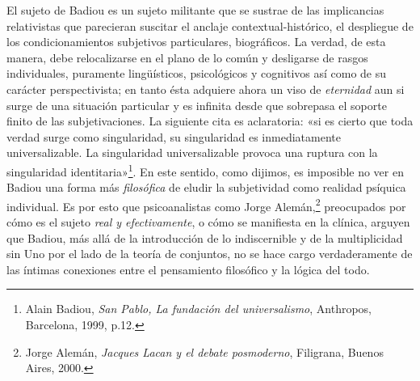 El sujeto de Badiou es un sujeto militante que se sustrae de las implicancias relativistas que parecieran suscitar el anclaje contextual-histórico, el despliegue de los condicionamientos subjetivos particulares, biográficos. La verdad, de esta manera, debe relocalizarse en el plano de lo común y desligarse de rasgos individuales, puramente lingüísticos, psicológicos y cognitivos así como de su carácter perspectivista; en tanto ésta adquiere ahora un viso de \emph{eternidad} aun si surge de una situación particular y es infinita desde que sobrepasa el soporte finito de las subjetivaciones. La siguiente cita es aclaratoria: «si es cierto que toda verdad surge como singularidad, su singularidad es inmediatamente universalizable. La singularidad universalizable provoca una ruptura con la singularidad identitaria»\footnote{Alain Badiou, \emph{San Pablo, La fundación del universalismo}, Anthropos, Barcelona, 1999, p.12.}. En este sentido, como dijimos, es imposible no ver en Badiou una forma más \emph{filosófica} de eludir la subjetividad como realidad psíquica individual. Es por esto que psicoanalistas como Jorge Alemán,\footnote{Jorge Alemán, \emph{Jacques Lacan y el debate posmoderno}, Filigrana, Buenos Aires, 2000.} preocupados por cómo es el sujeto \emph{real y efectivamente}, o cómo se manifiesta en la clínica, arguyen que Badiou, más allá de la introducción de lo indiscernible y de la multiplicidad sin Uno por el lado de la teoría de conjuntos, no se hace cargo verdaderamente de las íntimas conexiones entre el pensamiento filosófico y la lógica del todo.


